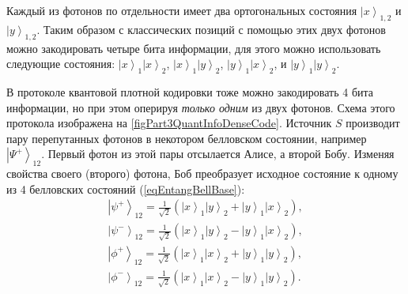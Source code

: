Каждый из фотонов по отдельности имеет два ортогональных состояния 
$\left|x\right>_{1,2}$ и $\left|y\right>_{1,2}$. Таким образом с
классических позиций с помощью этих двух фотонов можно закодировать
четыре бита информации, для этого можно использовать следующие
состояния:
$\left|x\right>_1 \left|x\right>_2$,
$\left|x\right>_1 \left|y\right>_2$,
$\left|y\right>_1 \left|x\right>_2$,
и 
$\left|y\right>_1 \left|y\right>_2$.



В протоколе квантовой плотной кодировки тоже можно закодировать 4
бита информации, но при этом оперируя {\it только одним} из двух 
фотонов. Схема этого протокола изображена на
\autoref{figPart3QuantInfoDenseCode}. Источник $S$ производит пару
перепутанных фотонов в некотором белловском состоянии, например
$\left|\Psi^{+}\right>_{12}$.  Первый фотон из этой пары отсылается Алисе,
а второй Бобу. Изменяя свойства своего (второго) фотона, Боб
преобразует исходное состояние к одному из 4 белловских состояний (\ref{eqEntangBellBase}):
\begin{eqnarray}
  \left|\psi^{+}\right>_{12} = 
  \frac{1}{\sqrt{2}}\left(
  \left|x\right>_1\left|y\right>_2 + 
  \left|y\right>_1\left|x\right>_2
  \right),
  \nonumber \\
  \left|\psi^{-}\right>_{12} = 
  \frac{1}{\sqrt{2}}\left(
  \left|x\right>_1\left|y\right>_2 - 
  \left|y\right>_1\left|x\right>_2
  \right),
  \nonumber \\
  \left|\phi^{+}\right>_{12} = 
  \frac{1}{\sqrt{2}}\left(
  \left|x\right>_1\left|x\right>_2 + 
  \left|y\right>_1\left|y\right>_2
  \right),
  \nonumber \\
  \left|\phi^{-}\right>_{12} = 
  \frac{1}{\sqrt{2}}\left(
  \left|x\right>_1\left|x\right>_2 - 
  \left|y\right>_1\left|y\right>_2
  \right).
  \label{eqQuantInfoBellBase}
\end{eqnarray}

